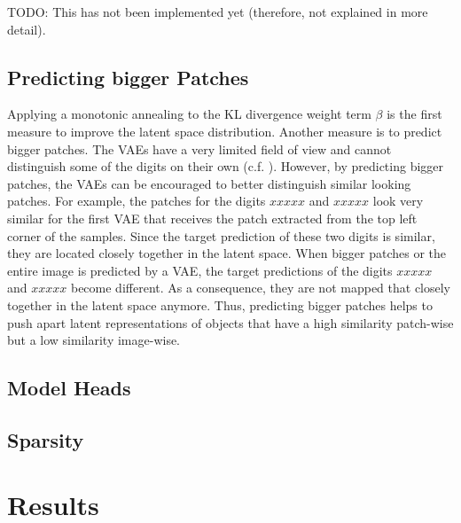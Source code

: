 TODO: This has not been implemented yet (therefore, not explained in more detail).


\subsection{Predicting bigger Patches}
Applying a monotonic annealing to the KL divergence weight term $\beta$ is the first measure to improve the latent space distribution.
Another measure is to predict bigger patches.
The VAEs have a very limited field of view and cannot distinguish some of the digits on their own (c.f. ).
However, by predicting bigger patches, the VAEs can be encouraged to better distinguish similar looking patches.
For example, the patches for the digits $xxxxx$ and $xxxxx$ look very similar for the first VAE that receives the patch extracted from the top left corner of the samples.
Since the target prediction of these two digits is similar, they are located closely together in the latent space.
When bigger patches or the entire image is predicted by a VAE, the target predictions of the digits $xxxxx$ and $xxxxx$ become different.
As a consequence, they are not mapped that closely together in the latent space anymore.
Thus, predicting bigger patches helps to push apart latent representations of objects that have a high similarity patch-wise but a low similarity image-wise.


\subsection{Model Heads}



\subsection{Sparsity}








\section{Results}












